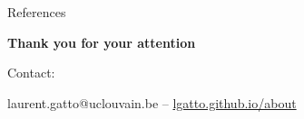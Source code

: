 \documentclass{beamer}
\theoremstyle{example}
\begin{document}
\begin{frame}[allowframebreaks]{References}
  \scriptsize
  
  
\end{frame}



\begin{frame}%

\vspace{.1cm}



\begin{center}
  \textbf{Thank you for your attention}
\end{center}


\bigskip

Contact:

\begin{center}
  laurent.gatto@uclouvain.be – \url{lgatto.github.io/about}
\end{center}

\end{frame}
\end{document}
